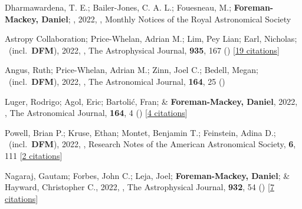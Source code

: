 \item[{\color{numcolor}\scriptsize86}] Dharmawardena, T. E.; Bailer-Jones, C. A. L.; Fouesneau, M.; \textbf{Foreman-Mackey, Daniel}; \etal, 2022, , Monthly Notices of the Royal Astronomical Society

\item[{\color{numcolor}\scriptsize85}] Astropy Collaboration; Price-Whelan, Adrian M.; Lim, Pey Lian; Earl, Nicholas; \etal\ (incl.\ \textbf{DFM}), 2022, , The Astrophysical Journal, \textbf{935}, 167 () [\href{https://ui.adsabs.harvard.edu/abs/2022ApJ...935..167A}{19 citations}]

\item[{\color{numcolor}\scriptsize84}] Angus, Ruth; Price-Whelan, Adrian M.; Zinn, Joel C.; Bedell, Megan; \etal\ (incl.\ \textbf{DFM}), 2022, , The Astronomical Journal, \textbf{164}, 25 ()

\item[{\color{numcolor}\scriptsize83}] Luger, Rodrigo; Agol, Eric; Bartoli{\'c}, Fran; \& \textbf{Foreman-Mackey, Daniel}, 2022, , The Astronomical Journal, \textbf{164}, 4 () [\href{https://ui.adsabs.harvard.edu/abs/2022AJ....164....4L}{4 citations}]

\item[{\color{numcolor}\scriptsize82}] Powell, Brian P.; Kruse, Ethan; Montet, Benjamin T.; Feinstein, Adina D.; \etal\ (incl.\ \textbf{DFM}), 2022, , Research Notes of the American Astronomical Society, \textbf{6}, 111 [\href{https://ui.adsabs.harvard.edu/abs/2022RNAAS...6..111P}{2 citations}]

\item[{\color{numcolor}\scriptsize81}] Nagaraj, Gautam; Forbes, John C.; Leja, Joel; \textbf{Foreman-Mackey, Daniel}; \& Hayward, Christopher C., 2022, , The Astrophysical Journal, \textbf{932}, 54 () [\href{https://ui.adsabs.harvard.edu/abs/2022ApJ...932...54N}{7 citations}]


